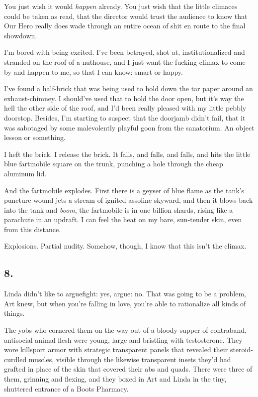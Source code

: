 You just wish it would \emph{happen} already. You just wish that
the little climaces could be taken as read, that the director would
trust the audience to know that Our Hero really does wade through
an entire ocean of shit en route to the final showdown.

I’m bored with being excited. I’ve been betrayed, shot at,
institutionalized and stranded on the roof of a nuthouse, and I
just want the fucking climax to come by and happen to me, so that I
can know: smart or happy.

I’ve found a half-brick that was being used to hold down the tar
paper around an exhaust-chimney. I should’ve used that to hold the
door open, but it’s way the hell the other side of the roof, and
I’d been really pleased with my little pebbly doorstop. Besides,
I’m starting to suspect that the doorjamb didn’t fail, that it was
sabotaged by some malevolently playful goon from the sanatorium. An
object lesson or something.

I heft the brick. I release the brick. It falls, and falls, and
falls, and hits the little blue fartmobile square on the trunk,
punching a hole through the cheap aluminum lid.

And the fartmobile explodes. First there is a geyser of blue flame
as the tank’s puncture wound jets a stream of ignited assoline
skyward, and then it blows back into the tank and \emph{boom}, the
fartmobile is in one billion shards, rising like a parachute in an
updraft. I can feel the heat on my bare, sun-tender skin, even from
this distance.

Explosions. Partial nudity. Somehow, though, I know that this isn’t
the climax.

\subsection{8.}

Linda didn’t like to argue{\dash}fight: yes, argue: no. That was going to
be a problem, Art knew, but when you’re falling in love, you’re
able to rationalize all kinds of things.

The yobs who cornered them on the way out of a bloody supper of
contraband, antisocial animal flesh were young, large and bristling
with testosterone. They wore killsport armor with strategic
transparent panels that revealed their steroid-curdled muscles,
visible through the likewise transparent insets they’d had grafted
in place of the skin that covered their abs and quads. There were
three of them, grinning and flexing, and they boxed in Art and
Linda in the tiny, shuttered entrance of a Boots Pharmacy.

